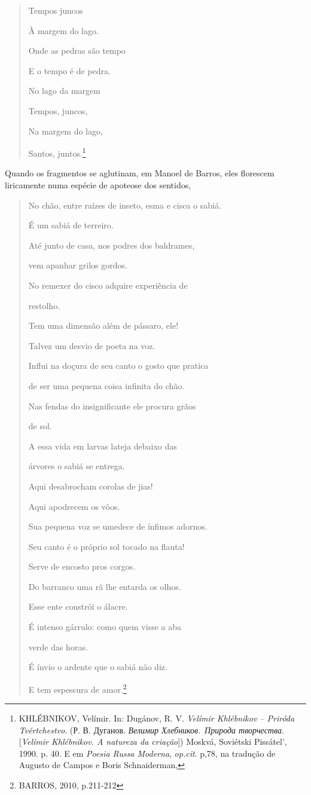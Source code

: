 \begin{quote}
Tempos juncos

À margem do lago.

Onde as pedras são tempo

E o tempo é de pedra.

No lago da margem

Tempos, juncos,

Na margem do lago,

Santos, juntos.\footnote{KHLÉBNIKOV, Velímir. In: Dugánov, R. V.
  \emph{Velímir Khlébnikov -- Priróda Tvértchestvo}. (Р. В. Дуганов.
  \emph{Велимир Хлебников}.~\emph{Природа творчества}. {[}\emph{Velímir
  Khlébnikov. A natureza da criação}{]}) Moskvá, Soviétski Pissátel',
  1990. p. 40. E em \emph{Poesia Russa Moderna}, \emph{op.cit}. p,78, na
  tradução de Augusto de Campos e Boris Schnaiderman,}
\end{quote}

Quando os fragmentos se aglutinam, em Manoel de Barros, eles florescem
liricamente numa espécie de apoteose dos sentidos,

\begin{quote}
No chão, entre raízes de inseto, esma e cisca o sabiá.

É um sabiá de terreiro.

Até junto de casa, nos podres dos baldrames,

vem apanhar grilos gordos.

No remexer do cisco adquire experiência de

restolho.

Tem uma dimensão além de pássaro, ele!

Talvez um desvio de poeta na voz.

Influi na doçura de seu canto o gosto que pratica

de ser uma pequena coisa infinita do chão.

Nas fendas do insignificante ele procura grãos

de sol.

A essa vida em larvas lateja debaixo das

árvores o sabiá se entrega.

Aqui desabrocham corolas de jias!

Aqui apodrecem os vôos.

Sua pequena voz se umedece de ínfimos adornos.

Seu canto é o próprio sol tocado na flauta!

Serve de encosto pros corgos.

Do barranco uma rã lhe entarda os olhos.

Esse ente constrói o álacre.

É intenso gárrulo: como quem visse a aba

verde das horas.

É ínvio o ardente que o sabiá não diz.

E tem espessura de amor.\footnote{BARROS, 2010, p.211-212}
\end{quote}

